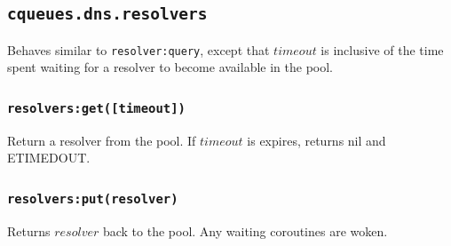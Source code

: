 \documentclass[11pt, oneside]{memoir}
\newcommand*{\fn}[1]{\texttt{#1}\xspace}
\newcounter{toccols}
\newenvironment{Module}[1]{
	\subsection{\texttt{#1}}
	\addtocontents{toc}{
		\protect\begin{multicols}{\value{toccols}}
	}
}{
	\addtocontents{toc}{\protect\end{multicols}}
}
\begin{document}
\begin{Module}{cqueues.dns.resolvers}
Behaves similar to \fn{resolver:query}, except that $timeout$ is inclusive of the time spent waiting for a resolver to become available in the pool.

\subsubsection[\fn{resolvers:get}]{\fn{resolvers:get([timeout])}}

Return a resolver from the pool. If $timeout$ is expires, returns nil and ETIMEDOUT.

\subsubsection[\fn{resolvers:put}]{\fn{resolvers:put(resolver)}}

Returns $resolver$ back to the pool. Any waiting coroutines are woken.

\end{Module}
\end{document}
